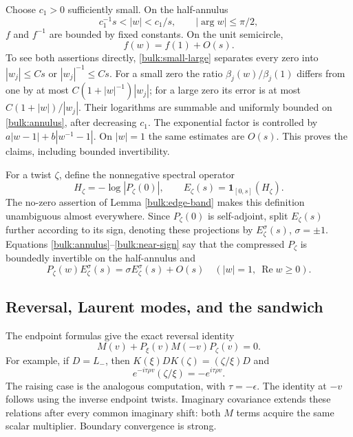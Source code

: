 Choose $c_1>0$ sufficiently small. On the half-annulus
\begin{equation}\label{bulk:annulus}
 c_1^{-1}s<|w|<c_1/s,\qquad |\arg w|\le\pi/2,
\end{equation}
$f$ and $f^{-1}$ are bounded by fixed constants. On the unit
semicircle,
\begin{equation}\label{bulk:near-sign}
 f(w)=f(1)+O(s).
\end{equation}
To see both assertions directly, \eqref{bulk:small-large} separates
every zero into $|w_j|\le Cs$ or $|w_j|^{-1}\le Cs$. For a small
zero the ratio $\beta_j(w)/\beta_j(1)$ differs from one by at most
$C(1+|w|^{-1})|w_j|$; for a large zero its error is at most
$C(1+|w|)/|w_j|$. Their logarithms are summable and uniformly
bounded on \eqref{bulk:annulus}, after decreasing $c_1$.
The exponential factor is controlled by
$a|w-1|+b|w^{-1}-1|$. On $|w|=1$ the same estimates are $O(s)$.
This proves the claims, including bounded invertibility.

For a twist $\zeta$, define the nonnegative spectral operator
\[
 H_\zeta=-\log|P_\zeta(0)|,\qquad
 E_\zeta(s)=\mathbf1_{[0,s]}(H_\zeta).
\]
The no-zero assertion of Lemma \ref{bulk:edge-band} makes this
definition unambiguous almost everywhere. Since $P_\zeta(0)$ is
self-adjoint, split $E_\zeta(s)$ further according to its sign,
denoting these projections by $E_\zeta^\sigma(s)$,
$\sigma=\pm1$. Equations \eqref{bulk:annulus}--\eqref{bulk:near-sign}
say that the compressed $P_\zeta$ is boundedly invertible on the
half-annulus and
\begin{equation}\label{bulk:sign-approx}
 P_\zeta(w)E_\zeta^\sigma(s)
 =\sigma E_\zeta^\sigma(s)+O(s)
 \quad (|w|=1,\ \operatorname{Re}w\ge0).
\end{equation}

\subsection{Reversal, Laurent modes, and the sandwich}

The endpoint formulas give the exact reversal identity
\begin{equation}\label{bulk:reversal}
 M(v)+P_\xi(v)M(-v)P_\zeta(v)=0.
\end{equation}
For example, if $D=L_-$, then
$K(\xi)DK(\zeta)=(\zeta/\xi)D$ and
\[
 e^{-i\tau\rho v}(\zeta/\xi)=-e^{i\tau\rho v}.
\]
The raising case is the analogous computation, with
$\tau=-\epsilon$. The identity at $-v$ follows using the inverse
endpoint twists. Imaginary covariance extends these relations
after every common imaginary shift: both $M$ terms acquire the
same scalar multiplier. Boundary convergence is strong.

